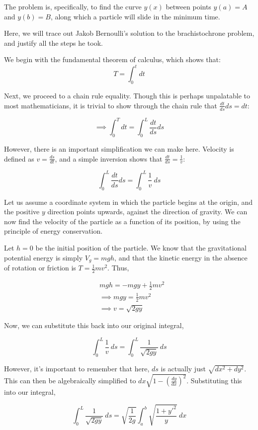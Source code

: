\documentclass[%
 preprint,
 amsmath,amssymb,
 aps,
 pra,
 fleqn
]{revtex4-2}
\begin{document}
The problem is, specifically, to find the curve $y(x)$ between points $y(a) = A$ and $y(b) = B$, along which a particle will slide in the minimum time.

Here, we will trace out Jakob Bernoulli's solution to the brachistochrone problem, and justify all the steps he took.

We begin with the fundamental theorem of calculus, which shows that:
\[T = \int_0^t dt\]

Next, we proceed to a chain rule equality.  Though this is perhaps unpalatable to most mathematicians, it is trivial to show through the chain rule that $\frac{dt}{ds} ds = dt$:

\[\implies \int_0^T dt = \int_0^L \frac{dt}{ds} ds\]

However, there is an important simplification we can make here.  Velocity is defined as $v = \frac{ds}{dt}$, and a simple inversion shows that $\frac{dt}{ds} = \frac 1v$:

\[\int_0^L \frac{dt}{ds} ds = \int_0^L \frac 1v ~ ds\]

Let us assume a coordinate system in which the particle begins at the origin, and the positive $y$ direction points upwards, against the direction of gravity.  We can now find the velocity of the particle as a function of its position, by using the principle of energy conservation.

Let $h = 0$ be the initial position of the particle.  We know that the gravitational potential energy is simply $V_g = mgh$, and that the kinetic energy in the absence of rotation or friction is $T = \frac12 mv^2$.  Thus,

\begin{align*}
    &mgh = -mgy + \frac12 mv^2\\
    &\implies mgy = \frac12 mv^2\\
    &\implies v = \sqrt{2gy}
\end{align*}

Now, we can substitute this back into our original integral,

\[\int_0^L \frac 1v ~ ds = \int_0^L \frac{1}{\sqrt{2gy}} ~ ds\]

However, it's important to remember that here, $ds$ is actually just $\sqrt{dx^2 + dy^2}$.  This can then be algebraically simplified to $dx\sqrt{1 - \left(\frac{dy}{dx}\right)^2}$.  Substituting this into our integral,

\[\int_0^L \frac{1}{\sqrt{2gy}} ~ ds = \sqrt{\frac{1}{2g}} \int_a^b \sqrt{\frac{1 + y'^2}{y}} ~ dx\]
\end{document}
